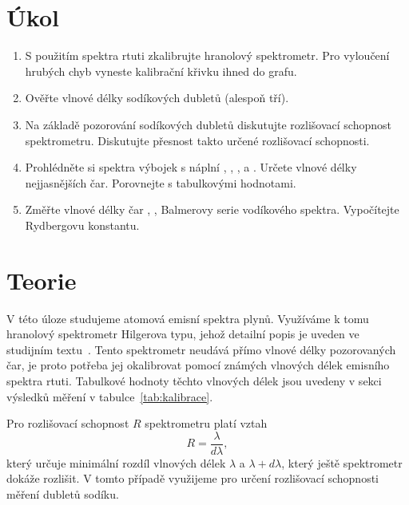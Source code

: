 \documentclass{protokol}
\begin{document}
    \section*{Úkol}

    \begin{enumerate}

        \item S použitím spektra rtuti zkalibrujte hranolový spektrometr.
        Pro vyloučení hrubých chyb vyneste kalibrační křivku ihned do grafu.
        \item Ověřte vlnové délky sodíkových dubletů (alespoň tří).
        \item Na základě pozorování sodíkových dubletů diskutujte rozlišovací schopnost spektrometru.
        Diskutujte přesnost takto určené rozlišovací schopnosti.
        \item Prohlédněte si spektra výbojek s náplní , , ,  a .
        Určete vlnové délky nejjasnějších čar.
        Porovnejte s tabulkovými hodnotami.
        \item Změřte vlnové délky čar , ,  Balmerovy serie vodíkového spektra.
        Vypočítejte Rydbergovu konstantu.

    \end{enumerate}

    \section*{Teorie}

    V této úloze studujeme atomová emisní spektra plynů.
    Využíváme k tomu hranolový spektrometr Hilgerova typu, jehož detailní popis je uveden ve studijním textu~\cite{pokyny}.
    Tento spektrometr neudává přímo vlnové délky pozorovaných čar, je proto potřeba jej okalibrovat pomocí známých vlnových délek emisního spektra rtuti.
    Tabulkové hodnoty těchto vlnových délek jsou uvedeny v sekci výsledků měření v tabulce~\ref{tab:kalibrace}.

    Pro rozlišovací schopnost $R$ spektrometru platí vztah
    \begin{equation} \label{eq:R}
        R = \frac{\lambda}{d\lambda},
    \end{equation}
    který určuje minimální rozdíl vlnových délek $\lambda$ a $\lambda + d\lambda$, který ještě spektrometr dokáže rozlišit.
    V tomto případě využijeme pro určení rozlišovací schopnosti měření dubletů sodíku.
\end{document}
